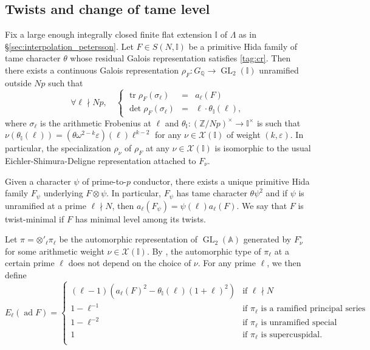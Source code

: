 \documentclass[12pt]{amsart}
\newcommand\bA{\mathbb{A}}
\newcommand\bI{\mathbb{I}}
\newcommand\bZ{\mathbb{Z}}
\newcommand\bQ{\mathbb{Q}}
\newcommand\cX{\mathcal{X}}
\DeclareMathOperator{\ad}{ad}
\DeclareMathOperator{\tr}{tr}
\DeclareMathOperator{\GL}{GL}
\theoremstyle{defstyle}
\theoremstyle{thmstyle}
\begin{document}
\subsection{Twists and change of tame level}
Fix a large enough integrally closed finite flat extension $\bI$ of $\Lambda$ as in \S\ref{sec:interpolation_petersson}. Let $F\in S(N,\bI)$ be a primitive Hida family of tame character $\theta$ whose residual Galois representation satisfies \eqref{tag:cr}. Then there exists a continuous Galois representation $\rho_F \colon G_{\bQ} \to \GL_2(\bI)$ unramified outside $Np$ such that 
\[\forall \ell 	\nmid Np,\quad \left\{\begin{array}{lcl}\tr\rho_F(\sigma_\ell)&=&a_\ell(F) \\
	\det\rho_F(\sigma_\ell)&=&\ell\cdot \theta_\bI(\ell),
\end{array}\right.\]
where $\sigma_\ell$ is the arithmetic Frobenius at $\ell$ and $\theta_\bI \colon (\bZ/Np)^\times \to \bI^\times$ is such that $\nu(\theta_\bI(\ell))=(\theta\omega^{2-k}\varepsilon)(\ell)\ell^{k-2}$ for any $\nu\in\cX(\bI)$ of weight $(k,\varepsilon)$. In particular, the specialization $\rho_{\nu}$ of $\rho_F$ at any $\nu\in\cX(\bI)$ is isomorphic to the usual Eichler-Shimura-Deligne representation attached to $F_\nu$.

Given a character $\psi$ of prime-to-$p$ conductor, there exists a unique primitive Hida family $F_\psi$ underlying $F \otimes \psi$. In particular, $F_\psi$ has tame character $\theta\psi^2$ and if $\psi$ is unramified at a prime $\ell\nmid N$, then $a_\ell(F_\psi)=\psi(\ell)a_\ell(F)$. We say that $F$ is twist-minimal if $F$ has minimal level among its twists. 

Let $\pi=\otimes'_\ell \pi_\ell$ be the automorphic representation of $\GL_2(\bA)$ generated by $F^\circ_\nu$ for some arithmetic weight $\nu\in\cX(\bI)$. By \cite[\S6.1]{dimitrov2014local}, the automorphic type of $\pi_\ell$ at a certain prime $\ell$ does not depend on the choice of $\nu$. For any prime $\ell$, we then define
\small 
\begin{equation}\label{eq:euler_factor}
	E_\ell(\ad F)=\left\{\begin{array}{ll}
	 (\ell-1)(a_\ell(F)^2-\theta_\bI(\ell)(1+\ell)^2)& \textrm{if $\ell\nmid N$} \\
	 1-\ell^{-1}& \textrm{if $\pi_\ell$ is a ramified principal series} \\
	 1-\ell^{-2}& \textrm{if $\pi_\ell$ is unramified special} \\
	 1& \textrm{if $\pi_\ell$ is supercuspidal}. \\
\end{array}\right.
\end{equation}\normalsize
\end{document}
